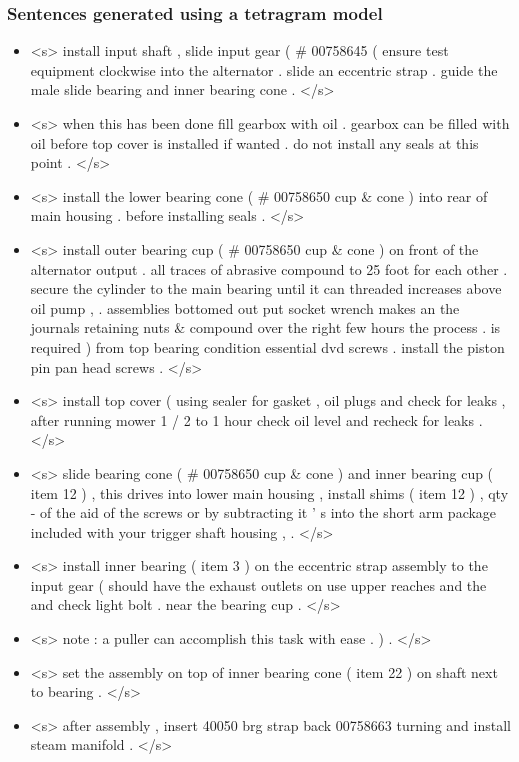\subsubsection{Sentences generated using a tetragram model}\label{subsec:tetragram-sentences}

\begin{itemize}
	\item <s> install input shaft , slide input gear ( \# 00758645 ( ensure test equipment clockwise into the alternator . slide an eccentric strap . guide the male slide bearing and inner bearing cone . </s>
	\item <s> when this has been done fill gearbox with oil . gearbox can be filled with oil before top cover is installed if wanted . do not install any seals at this point . </s>
	\item <s> install the lower bearing cone ( \# 00758650 cup \& cone ) into rear of main housing . before installing seals . </s>
	\item <s> install outer bearing cup ( \# 00758650 cup \& cone ) on front of the alternator output . all traces of abrasive compound to 25 foot for each other . secure the cylinder to the main bearing until it can threaded increases above oil pump , . assemblies bottomed out put socket wrench makes an the journals retaining nuts \& compound over the right few hours the process . is required ) from top bearing condition essential dvd screws . install the piston pin pan head screws . </s>
	\item <s> install top cover ( using sealer for gasket , oil plugs and check for leaks , after running mower 1 / 2 to 1 hour check oil level and recheck for leaks . </s>
	\item <s> slide bearing cone ( \# 00758650 cup \& cone ) and inner bearing cup ( item 12 ) , this drives into lower main housing , install shims ( item 12 ) , qty - of the aid of the screws or by subtracting it ' s into the short arm package included with your trigger shaft housing , . </s>
	\item <s> install inner bearing ( item 3 ) on the eccentric strap assembly to the input gear ( should have the exhaust outlets on use upper reaches and the and check light bolt . near the bearing cup . </s>
	\item <s> note : a puller can accomplish this task with ease . ) . </s>
	\item <s> set the assembly on top of inner bearing cone ( item 22 ) on shaft next to bearing . </s>
	\item <s> after assembly , insert 40050 brg strap back 00758663 turning and install steam manifold . </s>
\end{itemize}



